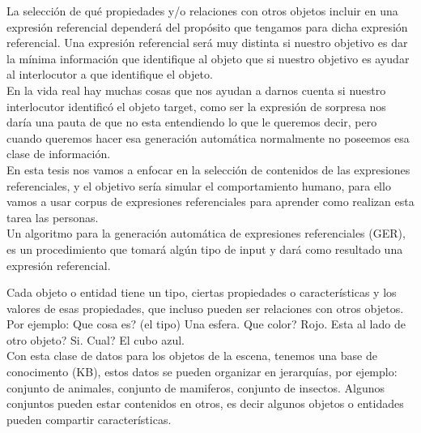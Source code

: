 %
La selecci\'on de qu\'e propiedades y/o relaciones con otros objetos incluir en una expresi\'on referencial depender\'a del prop\'osito que tengamos para dicha expresi\'on referencial. Una expresi\'on referencial ser\'a muy distinta si nuestro objetivo es dar la m\'inima informaci\'on que identifique al objeto que si nuestro objetivo es ayudar al interlocutor a que identifique el objeto.\\

En la vida real hay muchas cosas que nos ayudan a darnos cuenta si nuestro interlocutor identific\'o el objeto target, como ser la expresi\'on de sorpresa nos dar\'ia una pauta de que no esta entendiendo lo que le queremos decir, pero cuando queremos hacer esa generaci\'on autom\'atica normalmente no poseemos esa clase de informaci\'on.\\

En esta tesis nos vamos a enfocar en la selecci\'on de contenidos de las expresiones referenciales, y el objetivo ser\'ia simular el comportamiento humano, para ello vamos a usar corpus de expresiones referenciales para aprender como realizan esta tarea las personas.\\

Un algoritmo para la generaci\'on autom\'atica de expresiones referenciales (GER), es un procedimiento que tomar\'a alg\'un tipo de input y dar\'a como resultado una expresi\'on referencial.


Cada objeto o entidad tiene un tipo, ciertas propiedades o caracter\'isticas y los valores de esas propiedades, que incluso pueden ser relaciones con otros objetos. \\

Por ejemplo: Que cosa es? (el tipo) Una esfera. Que color? Rojo. Esta al lado de otro objeto? Si. Cual? El cubo azul.\\

Con esta clase de datos para los objetos de la escena, tenemos una base de conocimento (KB), estos datos se pueden organizar en jerarqu\'ias, por ejemplo: conjunto de animales, conjunto de mamiferos, conjunto de insectos. Algunos conjuntos pueden estar contenidos en otros, es decir algunos objetos o entidades pueden compartir caracter\'isticas.\\

